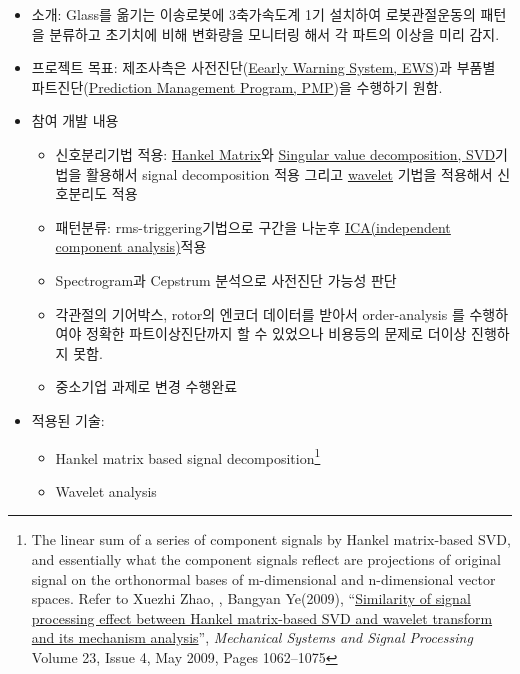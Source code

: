 \documentclass[10pt,a4paper,ragged2e]{altacv}
\begin{document}
\begin{fullwidth}
	\begin{itemize}
		\item 소개: Glass를 옮기는 이송로봇에 3축가속도계 1기 설치하여 로봇관절운동의 패턴을 분류하고 초기치에 비해 변화량을 모니터링 해서 각 파트의 이상을 미리 감지.
		\item 프로젝트 목표: 제조사측은 사전진단(\href{https://en.wikipedia.org/wiki/Early_warning_system}{Eearly Warning System, EWS})과 부품별 파트진단(\href{https://en.wikipedia.org/wiki/Predictive_maintenance}{Prediction Management Program, PMP})을 수행하기 원함.
		\item 참여 개발 내용
		      \begin{itemize}
			      \item 신호분리기법 적용: \href{https://en.wikipedia.org/wiki/Hankel_matrix}{Hankel Matrix}와 \href{https://en.wikipedia.org/wiki/Singular_value_decomposition}{Singular value decomposition, SVD}기법을 활용해서 signal decomposition 적용 그리고 \href{https://en.wikipedia.org/wiki/Wavelet}{wavelet} 기법을 적용해서 신호분리도 적용 \item 패턴분류: rms-triggering기법으로 구간을 나눈후 \href{https://en.wikipedia.org/wiki/Independent_component_analysis}{ICA(independent component analysis)}적용
			      \item Spectrogram과 Cepstrum 분석으로 사전진단 가능성 판단
			      \item 각관절의 기어박스, rotor의 엔코더 데이터를 받아서 order-analysis 를 수행하여야 정확한 파트이상진단까지 할 수 있었으나 비용등의 문제로 더이상 진행하지 못함.
			      \item 중소기업 과제로 변경 수행완료
		      \end{itemize}
		\item 적용된 기술:
		      \begin{itemize}
			      \item Hankel matrix based signal decomposition\footnote{The linear sum of a series of component signals by Hankel matrix-based SVD, and essentially what the component signals reflect are projections of original signal on the orthonormal bases of m-dimensional and n-dimensional vector spaces. Refer to Xuezhi Zhao, , Bangyan Ye(2009),  ``\href{http://www.sciencedirect.com/science/article/pii/S0888327008002604}{Similarity of signal processing effect between Hankel matrix-based SVD and wavelet transform and its mechanism analysis}'', \emph{Mechanical Systems and Signal Processing} Volume 23, Issue 4, May 2009, Pages 1062--1075}
			      \item Wavelet analysis

\end{itemize}
\end{itemize}
\end{fullwidth}
\end{document}
